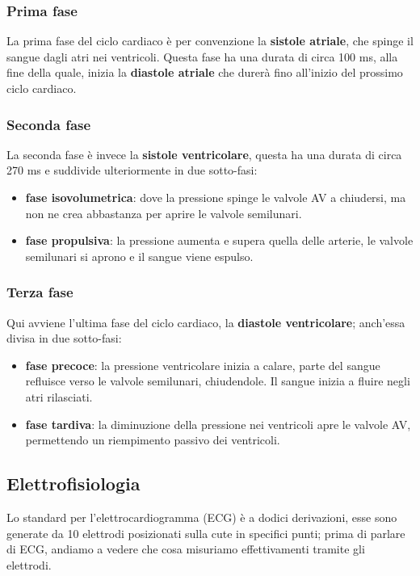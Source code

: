 \subsubsection{Prima fase}
La prima fase del ciclo cardiaco è per convenzione la \textbf{sistole atriale}, che spinge il sangue dagli atri nei ventricoli. Questa fase ha una durata di circa 100 ms, alla fine della quale, inizia la \textbf{diastole atriale} che durerà fino all'inizio del prossimo ciclo cardiaco.

\subsubsection{Seconda fase}
La seconda fase è invece la \textbf{sistole ventricolare}, questa ha una durata di circa 270 ms e suddivide ulteriormente in due sotto-fasi: 
\begin{itemize}
    \item \textbf{fase isovolumetrica}: dove la pressione spinge le valvole AV a chiudersi, ma non ne crea abbastanza per aprire le valvole semilunari.
    \item \textbf{fase propulsiva}: la pressione aumenta e supera quella delle arterie, le valvole semilunari si aprono e il sangue viene espulso.
\end{itemize}

\subsubsection{Terza fase}
Qui avviene l'ultima fase del ciclo cardiaco, la \textbf{diastole ventricolare}; anch'essa divisa in due sotto-fasi:
\begin{itemize}
    \item \textbf{fase precoce}: la pressione ventricolare inizia a calare, parte del sangue refluisce verso le valvole semilunari, chiudendole. Il sangue inizia a fluire negli atri rilasciati.
    \item \textbf{fase tardiva}: la diminuzione della pressione nei ventricoli apre le valvole AV, permettendo un riempimento passivo dei ventricoli.
\end{itemize}

\subsection{Elettrofisiologia}
Lo standard per l'elettrocardiogramma (ECG) è a dodici derivazioni, esse sono generate da 10 elettrodi posizionati sulla cute in specifici punti; prima di parlare di ECG, andiamo a vedere che cosa misuriamo effettivamenti tramite gli elettrodi.

